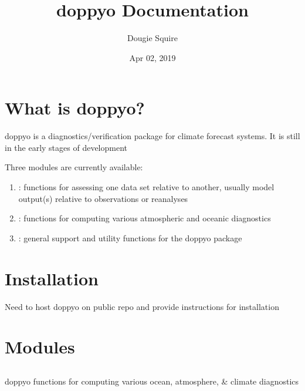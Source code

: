 \documentclass[letterpaper,10pt,english]{sphinxmanual}
\title{doppyo Documentation}
\date{Apr 02, 2019}
\author{Dougie Squire}
\begin{document}
\pagestyle{empty}
\sphinxmaketitle
\pagestyle{plain}
\sphinxtableofcontents
\pagestyle{normal}
\label{\detokenize{index::doc}}



\chapter{What is doppyo?}
\label{\detokenize{overview_doc:what-is-doppyo}}\label{\detokenize{overview_doc::doc}}
doppyo is a diagnostics/verification package for climate forecast systems. It is still in the early stages of development

Three modules are currently available:
\begin{enumerate}
\def\theenumi{\arabic{enumi}}
\def\labelenumi{\theenumi .}
\makeatletter\def\p@enumii{\p@enumi \theenumi .}\makeatother
\item {} 
 : functions for assessing one data set relative to another, usually model output(s) relative to observations or reanalyses

\item {} 
 : functions for computing various atmospheric and oceanic diagnostics

\item {} 
 : general support and utility functions for the doppyo package

\end{enumerate}


\chapter{Installation}
\label{\detokenize{installation_doc:installation}}\label{\detokenize{installation_doc::doc}}
Need to host doppyo on public repo and provide instructions for installation


\chapter{Modules}
\label{\detokenize{modules_doc:modules}}\label{\detokenize{modules_doc::doc}}

\section{}
\label{\detokenize{diagnostic_doc:module-diagnostic}}\label{\detokenize{diagnostic_doc:diagnostic}}\label{\detokenize{diagnostic_doc::doc}}
doppyo functions for computing various ocean, atmosphere, \& climate diagnostics
\end{document}
